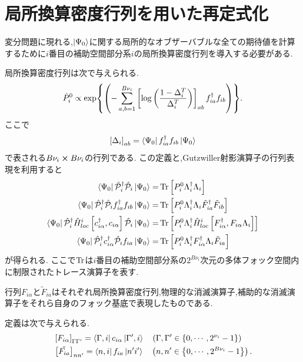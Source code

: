 \section{局所換算密度行列を用いた再定式化}
変分問題に現れる,$\Ket{\Psi_{0}}$に関する局所的なオブザーバブルな全ての期待値を計算するために$i$番目の補助空間部分系$i$の局所換算密度行列を導入する必要がある.

局所換算密度行列は次で与えられる.
\begin{equation}
    \hat{P}^{0}_{i}\propto \exp{ \left( -\sum_{a,b=1}^{B\nu_{i}} \left[ \log  \left( \frac{1-\Delta_{i}^{T}}{\Delta_{i}^{T}} \right) \right]_{ab}f^\dagger_{ia}f_{ib} \right)}.
\end{equation}
ここで
\begin{equation}
    \left[ \Delta_{i} \right]_{ab}=\Bra{\Psi_{0}}f^\dagger_{ia}f_{ib}\Ket{\Psi_{0}}
\end{equation}
で表される$B\nu_{i}\cross B\nu_{i}$の行列である.
この定義と,Gutzwiller射影演算子の行列表現を利用すると
\begin{align}
    \Bra{\Psi_{0}}\hat{\mathcal{P}}^\dagger_{i}\hat{\mathcal{P}}_{i}\Ket{\Psi_{0}}=&\Tr \left[ P_{i}^{0}\Lambda^\dagger_{i}\Lambda_{i} \right]  \label{10-1} \\ 
    \Bra{\Psi_{0}}\hat{\mathcal{P}}^\dagger_{i}\hat{\mathcal{P}}_{i}f^\dagger_{ia}f_{ib}\Ket{\Psi_{0}}=&\Tr \left[ P_{i}^{0}\Lambda^\dagger_{i}\Lambda_{i}\tilde{F}^\dagger_{ia}\tilde{F}_{ib} \right]  \label{10-2} \\ 
    \Bra{\Psi_{0}}\hat{\mathcal{P}}^\dagger_{i}\hat{H}^{i}_{loc}\left[ c^\dagger_{i\alpha},c_{i\alpha} \right]\hat{\mathcal{P}}_{i}\Ket{\Psi_{0}}=&\Tr \left[ P_{i}^{0}\Lambda^\dagger_{i}\hat{H}^{i}_{loc}\left[ F^\dagger_{i\alpha}, F_{i\alpha}\Lambda_{i} \right] \right]   \label{10-3} \\ 
    \Bra{\Psi_{0}}\hat{\mathcal{P}}^\dagger_{i}c^\dagger_{i\alpha}\hat{\mathcal{P}}_{i}f_{ia}\Ket{\Psi_{0}}=&\Tr \left[ P_{i}^{0}\Lambda^\dagger_{i}F^\dagger_{i\alpha}\Lambda_{i}\tilde{F}_{ia} \right]  \label{10-4}
\end{align}
が得られる.
ここで$\Tr$は$i$番目の補助空間部分系の$2^{B\nu_{i}}$次元の多体フォック空間内に制限されたトレース演算子を表す.

行列$F_{i\alpha}$と$\tilde{F}_{ia}$はそれぞれ局所換算密度行列,物理的な消滅演算子,補助的な消滅演算子をそれら自身のフォック基底で表現したものである.

定義は次で与えられる.
\begin{align}
    &\left[ F_{i\alpha} \right]_{\Gamma\Gamma'}=\Bra{\Gamma,i}c_{i\alpha}\Ket{\Gamma',i}\quad\left( \Gamma,\Gamma'\in \left \{ 0,\cdots,2^{\nu_{i}}-1 \right\} \right)\\
    &\left[ \tilde{F_{ia}} \right]_{nn'}=\Bra{n,i}f_{ia}\Ket{n'i'}\quad \left( n,n'\in \left \{ 0,\cdots,2^{B\nu_{i}}-1 \right\} \right).
\end{align}

